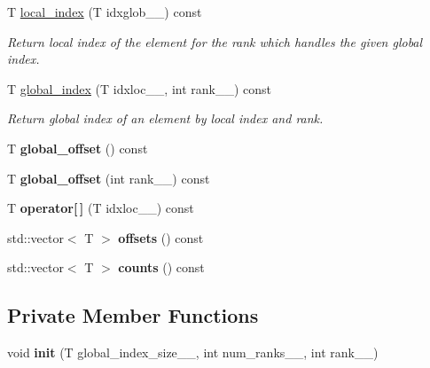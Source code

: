 \begin{DoxyCompactItemize}
T \hyperlink{classsddk_1_1splindex_3_01block_00_01_t_01_4_adbce5d5cb40f0d769cf1e9477d7f5028}{local\+\_\+index} (T idxglob\+\_\+\+\_\+) const 
\begin{DoxyCompactList}\small\item\em Return local index of the element for the rank which handles the given global index. \end{DoxyCompactList}\item 
T \hyperlink{classsddk_1_1splindex_3_01block_00_01_t_01_4_ad25adbb2c425f1743fcdd887f16a477a}{global\+\_\+index} (T idxloc\+\_\+\+\_\+, int rank\+\_\+\+\_\+) const 
\begin{DoxyCompactList}\small\item\em Return global index of an element by local index and rank. \end{DoxyCompactList}\item 
\hypertarget{classsddk_1_1splindex_3_01block_00_01_t_01_4_a77d21df338f0a97d5d34805d5a6f575b}{}T {\bfseries global\+\_\+offset} () const \label{classsddk_1_1splindex_3_01block_00_01_t_01_4_a77d21df338f0a97d5d34805d5a6f575b}

\item 
\hypertarget{classsddk_1_1splindex_3_01block_00_01_t_01_4_a158d8d9cbe4e21b77d51bdcede72fff7}{}T {\bfseries global\+\_\+offset} (int rank\+\_\+\+\_\+) const \label{classsddk_1_1splindex_3_01block_00_01_t_01_4_a158d8d9cbe4e21b77d51bdcede72fff7}

\item 
\hypertarget{classsddk_1_1splindex_3_01block_00_01_t_01_4_a6fda4650a8b5d1ca5e6f3570668f8154}{}T {\bfseries operator\mbox{[}$\,$\mbox{]}} (T idxloc\+\_\+\+\_\+) const \label{classsddk_1_1splindex_3_01block_00_01_t_01_4_a6fda4650a8b5d1ca5e6f3570668f8154}

\item 
\hypertarget{classsddk_1_1splindex_3_01block_00_01_t_01_4_ad79fc4228d8e598522658a4f865b53b4}{}std\+::vector$<$ T $>$ {\bfseries offsets} () const \label{classsddk_1_1splindex_3_01block_00_01_t_01_4_ad79fc4228d8e598522658a4f865b53b4}

\item 
\hypertarget{classsddk_1_1splindex_3_01block_00_01_t_01_4_aef75b1b5934c83d8b2907587c605fd73}{}std\+::vector$<$ T $>$ {\bfseries counts} () const \label{classsddk_1_1splindex_3_01block_00_01_t_01_4_aef75b1b5934c83d8b2907587c605fd73}

\end{DoxyCompactItemize}
\subsection*{Private Member Functions}
\begin{DoxyCompactItemize}
\item 
\hypertarget{classsddk_1_1splindex_3_01block_00_01_t_01_4_ac70744be65da7e6080771bbfa294f7f8}{}void {\bfseries init} (T global\+\_\+index\+\_\+size\+\_\+\+\_\+, int num\+\_\+ranks\+\_\+\+\_\+, int rank\+\_\+\+\_\+)\label{classsddk_1_1splindex_3_01block_00_01_t_01_4_ac70744be65da7e6080771bbfa294f7f8}

\end{DoxyCompactItemize}
